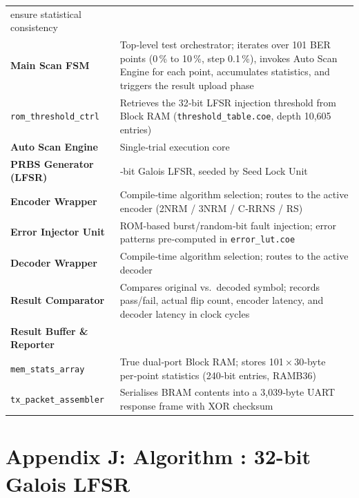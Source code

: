 \documentclass[
  12pt,
  a4paper]{report}
\begin{document}
{\begin{longtable}[]{@{}
  >{\raggedright\arraybackslash}p{}
  >{\raggedright\arraybackslash}p{}@{}}
ensure statistical consistency \\
\textbf{Main Scan FSM}\hspace{0pt} & Top‑level test orchestrator;
iterates over 101 BER points (0\,\% to 10\,\%, step 0.1\,\%), invokes
Auto Scan Engine for each point, accumulates statistics, and triggers
the result upload phase \\
\texttt{rom\_threshold\_ctrl} & Retrieves the 32‑bit LFSR injection
threshold from Block RAM (\texttt{threshold\_table.coe}, depth 10,605
entries) \\
\textbf{Auto Scan Engine}\hspace{0pt} & Single‑trial execution core \\
\textbf{PRBS Generator (LFSR)}\hspace{0pt} & 32‑bit Galois LFSR, seeded
by Seed Lock Unit \\
\textbf{Encoder Wrapper}\hspace{0pt} & Compile‑time algorithm selection;
routes to the active encoder (2NRM / 3NRM / C‑RRNS / RS) \\
\textbf{Error Injector Unit}\hspace{0pt} & ROM‑based burst/random‑bit
fault injection; error patterns pre‑computed in
\texttt{error\_lut.coe} \\
\textbf{Decoder Wrapper}\hspace{0pt} & Compile‑time algorithm selection;
routes to the active decoder \\
\textbf{Result Comparator}\hspace{0pt} & Compares original vs.~decoded
symbol; records pass/fail, actual flip count, encoder latency, and
decoder latency in clock cycles \\
\textbf{Result Buffer \& Reporter}\hspace{0pt} & \\
\texttt{mem\_stats\_array} & True dual‑port Block RAM; stores
101\,×\,30‑byte per‑point statistics (240‑bit entries, RAMB36) \\
\texttt{tx\_packet\_assembler} & Serialises BRAM contents into a
3,039‑byte UART response frame with XOR checksum \\
\end{longtable}
}

\section{Appendix J: Algorithm : 32-bit Galois
LFSR}\label{appendix-j-algorithm-32-bit-galois-lfsr}
\end{document}
